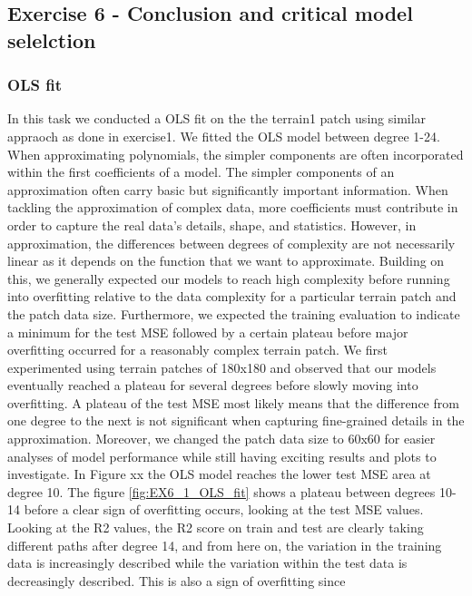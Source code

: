 \documentclass[11pt, a4paper]{article}
\begin{document}
\newpage
\subsection*{Exercise 6 - Conclusion and critical model selelction}
\subsubsection*{OLS fit}
In this task we conducted a OLS fit on the the terrain1 patch using similar appraoch as done in exercise1. We fitted the OLS model between degree 1-24.
When approximating polynomials, the simpler components are often incorporated within the first coefficients of a model. The simpler components of an approximation 
often carry basic but significantly important information. When tackling the approximation of complex data, more coefficients must contribute in order to capture the 
real data's details, shape, and statistics. However, in approximation, the differences between degrees of complexity are not necessarily linear as it depends on the 
function that we want to approximate. Building on this, we generally expected our models to reach high complexity before running into overfitting relative to the data 
complexity for a particular terrain patch and the patch data size. Furthermore, we expected the training evaluation to indicate a minimum for the test MSE followed by a
certain plateau before major overfitting occurred for a reasonably complex terrain patch. 
We first experimented using terrain patches of 180x180 and observed that our models eventually reached a plateau for several degrees before slowly moving into overfitting.
A plateau of the test MSE most likely means that the difference from one degree to the next is not significant when capturing fine-grained details in the approximation.
Moreover, we changed the patch data size to 60x60 for easier analyses of model performance while still having exciting results and plots to investigate. 
In Figure xx the OLS model reaches the lower test MSE area at degree 10. The figure \ref{fig:EX6_1_OLS_fit} shows a plateau between degrees 10-14 before a clear sign of overfitting occurs, 
looking at the test MSE values. Looking at the R2 values, the R2 score on train and test are clearly taking different paths after degree 14, and from here on, 
the variation in the training data is increasingly described while the variation within the test data is decreasingly described. This is also a sign of overfitting since
\end{document}
